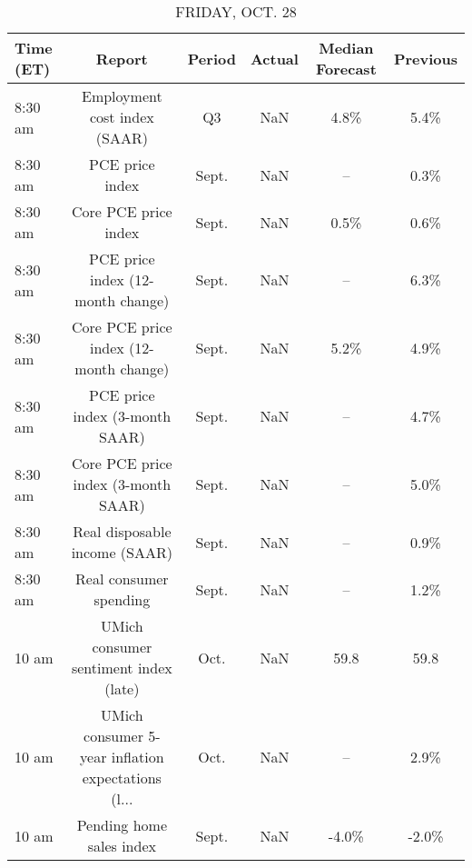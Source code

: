 \documentclass{article}%
\begin{document}
\begin{table}[htbp]%
\caption{FRIDAY, OCT. 28}%
\centering%
\begin{adjustbox}{width=1\textwidth}%
\begin{tabular}{lccccc}
\toprule
Time (ET) &                                             Report & Period & Actual & Median Forecast & Previous \\
\midrule
  8:30 am &                       Employment cost index (SAAR) &     Q3 &    NaN &            4.8\% &     5.4\% \\
  8:30 am &                                    PCE price index &  Sept. &    NaN &              -- &     0.3\% \\
  8:30 am &                               Core PCE price index &  Sept. &    NaN &            0.5\% &     0.6\% \\
  8:30 am &                  PCE price index (12-month change) &  Sept. &    NaN &              -- &     6.3\% \\
  8:30 am &             Core PCE price index (12-month change) &  Sept. &    NaN &            5.2\% &     4.9\% \\
  8:30 am &                     PCE price index (3-month SAAR) &  Sept. &    NaN &              -- &     4.7\% \\
  8:30 am &                Core PCE price index (3-month SAAR) &  Sept. &    NaN &              -- &     5.0\% \\
  8:30 am &                      Real disposable income (SAAR) &  Sept. &    NaN &              -- &     0.9\% \\
  8:30 am &                             Real consumer spending &  Sept. &    NaN &              -- &     1.2\% \\
    10 am &              UMich consumer sentiment index (late) &   Oct. &    NaN &            59.8 &     59.8 \\
    10 am & UMich consumer 5-year inflation expectations (l... &   Oct. &    NaN &              -- &     2.9\% \\
    10 am &                           Pending home sales index &  Sept. &    NaN &           -4.0\% &    -2.0\% \\
\bottomrule
\end{tabular}
%
\end{adjustbox}%
\end{table}
\end{document}
